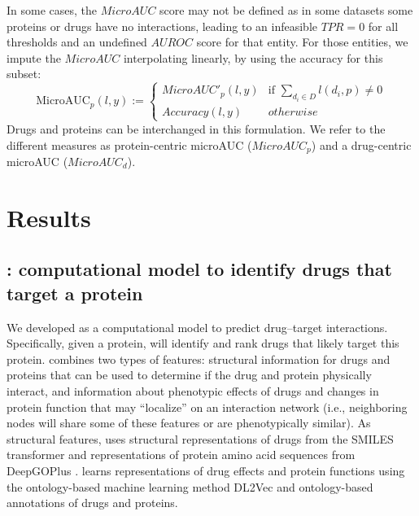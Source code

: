 \documentclass{bioinfo}
\renewcommand{\cite}{\citep}
\begin{document}
In some cases, the $MicroAUC$ score may not be defined as in some
datasets some proteins or drugs have no interactions, leading to an
infeasible $TPR=0$ for all thresholds and an undefined $AUROC$ score
for that entity. For those entities, we impute the $MicroAUC$
interpolating linearly, by using the accuracy for this
subset:
\begin{equation*}
	\textrm{MicroAUC}_p(l,y) := 
	\begin{cases}
		MicroAUC'_p(l,y) & \text{if }\sum_{d_i\in
                  D}l(d_i,p)\neq 0\\
		Accuracy(l,y)&otherwise
	\end{cases}
\end{equation*}
Drugs and proteins can be interchanged in this formulation. We refer
to the different measures as protein-centric microAUC ($MicroAUC_p$)
and a drug-centric microAUC ($MicroAUC_d$).

\section{Results}

\subsection{\name{}: computational model to identify drugs that target a
  protein}


We developed \name{} as a computational model to predict drug--target
interactions. Specifically, given a protein, \name{} will identify and
rank drugs that likely target this protein. \name{} combines two types
of features: structural information for drugs and proteins that can be
used to determine if the drug and protein physically interact, and
information about phenotypic effects of drugs and changes in protein
function that may ``localize'' on an interaction network (i.e.,
neighboring nodes will share some of these features or are
phenotypically similar). As structural features, \name{} uses
structural representations of drugs from the SMILES transformer
\cite{SmilesTransformer} and representations of protein amino acid
sequences from DeepGOPlus \cite{DeepGoPlus}.  \name{} learns
representations of drug effects and protein functions using the
ontology-based machine learning method DL2Vec \cite{DL2vec2020} and
ontology-based annotations of drugs and proteins.
\end{document}
